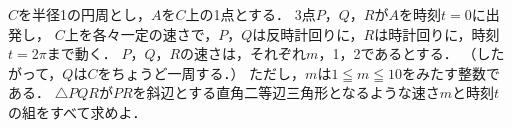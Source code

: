 \documentclass[../../main.tex]{subfiles}
\begin{document}
$C$を半径1の円周とし，$A$を$C$上の1点とする．
3点$P$，$Q$，$R$が$A$を時刻$t=0$に出発し，
$C$上を各々一定の速さで，$P$，$Q$は反時計回りに，$R$は時計回りに，時刻$t=2\pi$まで動く．
$P$，$Q$，$R$の速さは，それぞれ$m$，1，2であるとする．
（したがって，$Q$は$C$をちょうど一周する．）
ただし，$m$は$1 \leqq m \leqq 10$をみたす整数である．
$\triangle PQR$が$PR$を斜辺とする直角二等辺三角形となるような速さ$m$と時刻$t$の組をすべて求めよ．
\end{document}
